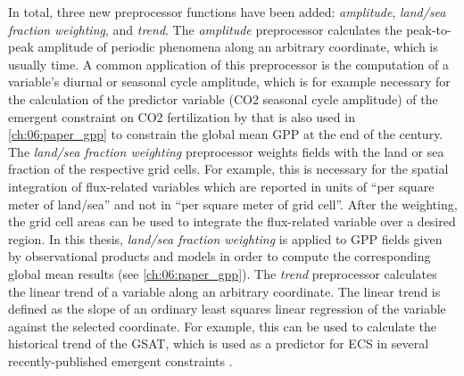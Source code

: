 In total, three new preprocessor functions have been added: \emph{amplitude},
\emph{land/sea fraction weighting}, and \emph{trend}. The \emph{amplitude}
preprocessor calculates the peak-to-peak amplitude of periodic phenomena along
an arbitrary coordinate, which is usually time. A common application of this
preprocessor is the computation of a variable's diurnal or seasonal cycle
amplitude, which is for example necessary for the calculation of the predictor
variable (\ac{CO2} seasonal cycle amplitude) of the emergent constraint on
\ac{CO2} fertilization by \textcite{Wenzel2016} that is also used in
\cref{ch:06:paper_gpp} to constrain the global mean \ac{GPP} at the end of the
 century. The \emph{land/sea fraction weighting} preprocessor weights
fields with the land or sea fraction of the respective grid cells. For example,
this is necessary for the spatial integration of flux-related variables which
are reported in units of \enquote{per square meter of land/sea} and not in
\enquote{per square meter of grid cell}. After the weighting, the grid cell
areas can be used to integrate the flux-related variable over a desired region.
In this thesis, \emph{land/sea fraction weighting} is applied to \ac{GPP}
fields given by observational products and models in order to compute the
corresponding global mean results (see \cref{ch:06:paper_gpp}). The
\emph{trend} preprocessor calculates the linear trend of a variable along an
arbitrary coordinate. The linear trend is defined as the slope of an ordinary
least squares linear regression of the variable against the selected
coordinate. For example, this can be used to calculate the historical trend of
the \ac{GSAT}, which is used as a predictor for \ac{ECS} in several
recently-published emergent constraints \autocite{JimenezdelaCuesta2019,
  Nijsse2020, Tokarska2020}.

